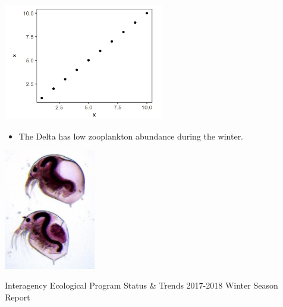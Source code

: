 \documentclass[]{article}\usepackage[]{graphicx}\usepackage[]{color}
\begin{document}
\begin{Row}
  \begin{Cell}{4}
    \begin{center}
      \includegraphics[width=7cm,align=m]{figures/zoop/placeholder_fig.png}
      \begin{itemize}[leftmargin=1.5cm,rightmargin=1cm,topsep=10pt]
        \item The Delta has low zooplankton abundance during the winter.
      \end{itemize}
    \end{center}
  \end{Cell}
  
  \begin{Cell}{3}
    \begin{center}
      \includegraphics[width=4cm,trim=0 0 0 0,clip,align=m]{figures/zoop/bug3.jpg}
    \end{center}
  \end{Cell}  
\end{Row}


\newpage


\hypertarget{page:fish}{}
\begin{Row}
  \begin{Cell}{1}
    \begin{center}
      {\Large Interagency Ecological Program Status \& Trends 2017-2018 Winter Season Report}
    \end{center}
  \end{Cell}
\end{Row}
\end{document}
